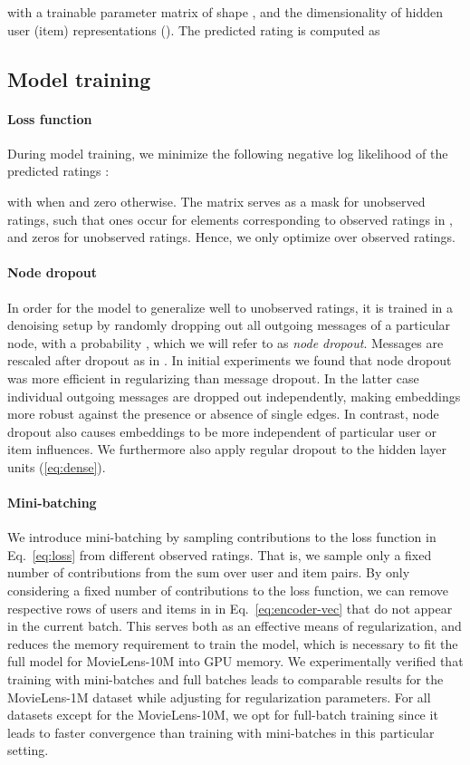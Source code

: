 \documentclass[twoside]{article}
\begin{document}
with  a trainable parameter matrix of shape , and  the dimensionality of hidden user (item) representations  ().
The predicted rating is computed as 


\subsection{Model training}
\paragraph{Loss function} During model training, we minimize the following negative log likelihood of the predicted ratings :

with  when  and zero otherwise. The matrix  serves as a mask for unobserved ratings, such that ones occur for elements corresponding to observed ratings in , and zeros for unobserved ratings. Hence, we only optimize over observed ratings.

\paragraph{Node dropout} 
In order for the model to generalize well to unobserved ratings, it is trained in a denoising setup by randomly dropping out all outgoing messages of a particular node, with a probability , which we will refer to as \textit{node dropout}. Messages are rescaled after dropout as in \cite{srivastava2014dropout}. In initial experiments we found that node dropout was more efficient in regularizing than message dropout. In the latter case individual outgoing messages are dropped out independently, making embeddings more robust against the presence or absence of single edges. In contrast, node dropout  also causes embeddings to be more independent of particular user or item influences. We furthermore also apply regular dropout \cite{srivastava2014dropout} to the hidden layer units (\ref{eq:dense}).

\paragraph{Mini-batching}
We introduce mini-batching by sampling contributions to the loss function in Eq.~\eqref{eq:loss} from different observed ratings. That is, we sample only a fixed number of contributions from the sum over user and item pairs. By only considering a fixed number of contributions to the loss function, we can remove respective rows of users and items in  in Eq.~\eqref{eq:encoder-vec} that do not appear in the current batch. This serves both as an effective means of regularization, and reduces the memory requirement to train the model, which is necessary to fit the full model for MovieLens-10M into GPU memory. 
We experimentally verified that training with mini-batches and full batches leads to comparable results for the MovieLens-1M dataset while adjusting for regularization parameters. For all datasets except for the MovieLens-10M, we opt for full-batch training since it leads to faster convergence than training with mini-batches in this particular setting.
\end{document}
